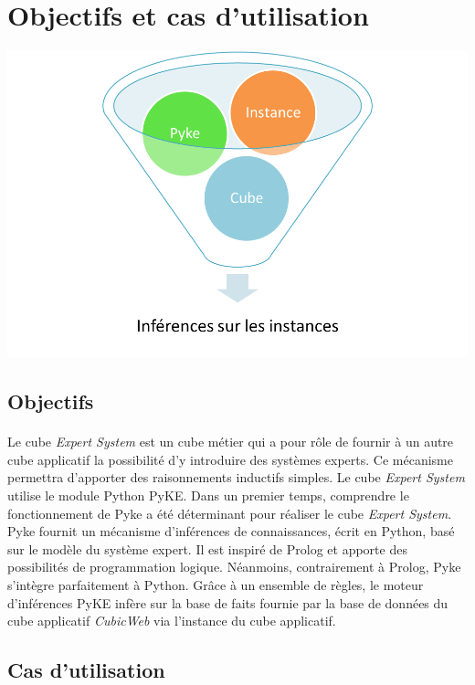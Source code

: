 \documentclass {report}
\begin{document}
\section{Objectifs et cas d'utilisation}
\begin{multicols}{2}
\begin{center}
\flushright
\includegraphics[scale=0.5]{pyke.png} 
\end{center}
\subsection{Objectifs}
\paragraph{}
Le cube \textit{Expert System} est un cube métier qui a pour rôle de fournir à un autre cube applicatif la possibilité d'y introduire des systèmes experts. Ce mécanisme permettra d'apporter des raisonnements inductifs simples. Le cube \textit{Expert System} utilise le module Python PyKE. Dans un premier temps, comprendre le fonctionnement de Pyke a été déterminant pour réaliser le cube \textit{Expert System}. Pyke fournit un mécanisme d'inférences de connaissances, écrit en Python, basé sur le modèle du système expert. Il est inspiré de Prolog et apporte des possibilités de programmation logique. Néanmoins, contrairement à Prolog, Pyke s'intègre parfaitement à Python. Grâce à un ensemble de règles, le moteur d'inférences PyKE infère sur la base de faits fournie par la base de données du cube applicatif \textit{CubicWeb} via l'instance du cube applicatif. 
\end{multicols}

\subsection{Cas d'utilisation}
\end{document}
